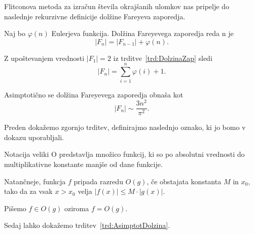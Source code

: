 \documentclass[mat1]{fmfdelo}
\begin{document}
Flitconova metoda za izračun števila okrajšanih ulomkov nas pripelje do naslednje rekurzivne definicije dolžine Fareyeva zaporedja.

\begin{trditev}
\label{trd:DolzinaZap}
Naj bo $\varphi(n)$ Eulerjeva funkcija. Dolžina Fareyevega zaporedja reda n je
\[  |F_{n}| = |F_{n-1}| + \varphi(n). \]
\end{trditev}

\begin{opomba}
\label{op:AsimptotDolzina}
Z upoštevanjem vrednosti $|F_{1}| = 2$ iz trditve~\ref{trd:DolzinaZap} sledi \[  |F_{n}| = \sum_{i=1}^n \varphi(i) + 1. \]
\end{opomba}

\begin{trditev}
\label{trd:AsimptotDolzina}
Asimptotično se dolžina Fareyevega zaporedja obnaša kot
\[  |F_{n}|\sim\frac{3n^2}{\pi^2}. \]
\end{trditev}

Preden dokažemo zgornjo trditev, definirajmo naslednjo oznako, ki jo bomo v dokazu uporabljali.

\begin{definicija}
Notacija veliki O predstavlja množico funkcij, ki so po absolutni vrednosti do multiplikativne konstante manjše od dane funkcije.

Natančneje, funkcja $f$ pripada razredu $O(g)$, če obstajata konstanta $M$ in $x_{0}$, tako da za vsak $x > x_{0}$ velja $|f(x)| \leq M \cdot |g(x)|$.

Pišemo $f \in O(g)$ oziroma $f = O(g)$.
\end{definicija}

Sedaj lahko dokažemo trditev~\ref{trd:AsimptotDolzina}.
\end{document}
